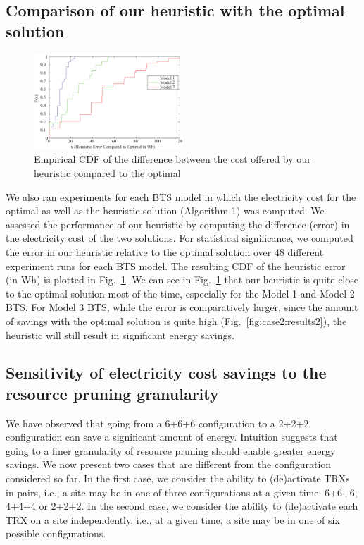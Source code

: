 \subsection{Comparison of our heuristic with the optimal solution}
\label{subsec:case2:results:heuristic1}

\begin{figure}
\centering
\includegraphics[width=0.5\textwidth]{pics/heuristicerror-touchedup.eps}
\caption{Empirical CDF of the difference between the cost offered by our heuristic compared to the optimal}
\label{fig:results5}
\end{figure}

We also ran experiments for each BTS model in which the electricity cost for the optimal as well as the heuristic solution (Algorithm 1) was computed. We assessed the performance of our heuristic by computing the difference (error) in the electricity cost of the two solutions. For statistical significance, we computed the error in our heuristic relative to the optimal solution over 48 different experiment runs for each BTS model. The resulting CDF of the heuristic error (in Wh) is plotted in Fig.~\ref{fig:results5}. We can see in Fig.~\ref{fig:results5} that our heuristic is quite close to the optimal solution most of the time, especially for the Model 1 and Model 2 BTS. For Model 3 BTS, while the error is comparatively larger, since the amount of savings with the optimal solution is quite high (Fig.~\ref{fig:case2:results2}), the heuristic will still result in significant energy savings.  

\subsection{Sensitivity of electricity cost savings to the resource pruning granularity} %
\label{subsec:case2:results:granularity} We have observed that going from a 6+6+6 configuration to a 2+2+2 configuration can save a significant amount of energy. Intuition suggests that going to a finer granularity of resource pruning should enable greater energy savings. We now present two cases that are different from the configuration considered so far. In the first case, we consider the ability to (de)activate TRXs in pairs, i.e., a site may be in one of three configurations at a given time: 6+6+6, 4+4+4 or 2+2+2. In the second case, we consider the ability to (de)activate each TRX on a site independently, i.e., at a given time, a site may be in one of six possible configurations. 

